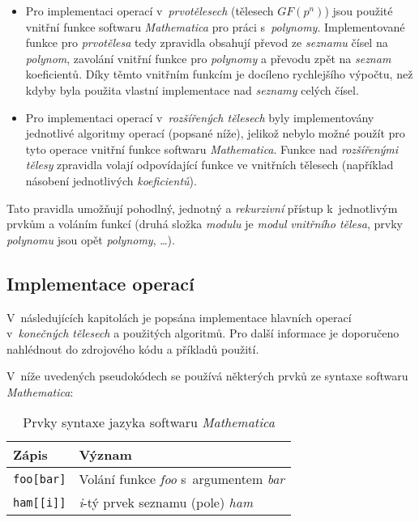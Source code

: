 \documentclass[thesis=M,czech,hidelinks]{FITthesis}[2012/06/26]
\newcommand{\0}{{\textcolor[gray]{0.100}{0}}}
\begin{document}
\begin{itemize}
    \item Pro implementaci operací v~\emph{prvotělesech} (tělesech $GF(p^n)$)
        jsou použité vnitřní funkce softwaru \emph{Mathematica} pro práci
        s~\emph{polynomy}. Implementované funkce pro \emph{prvotělesa} tedy
        zpravidla obsahují převod ze \emph{seznamu} čísel na \emph{polynom},
        zavolání vnitřní funkce pro \emph{polynomy} a převodu zpět na
        \emph{seznam} koeficientů. Díky těmto vnitřním funkcím je docíleno
        rychlejšího výpočtu, než kdyby byla použita vlastní implementace nad
        \emph{seznamy} celých čísel.

    \item Pro implementaci operací v~\emph{rozšířených tělesech} byly
        implementovány jednotlivé algoritmy operací (popsané níže), jelikož
        nebylo možné použít pro tyto operace vnitřní funkce softwaru
        \emph{Mathematica}. Funkce nad \emph{rozšířenými tělesy} zpravidla
        volají odpovídající funkce ve vnitřních tělesech (například násobení
        jednotlivých \emph{koeficientů}).

\end{itemize}

Tato pravidla umožňují pohodlný, jednotný a \emph{rekurzivní} přístup
k~jednotlivým prvkům a voláním funkcí (druhá složka \emph{modulu} je
\emph{modul} \emph{vnitřního tělesa}, prvky \emph{polynomu} jsou opět
\emph{polynomy}, \ldots).

\subsection{Implementace operací}
V~následujících kapitolách je popsána implementace hlavních operací
v~\emph{konečných tělesech} a použitých algoritmů. Pro další informace je
doporučeno nahlédnout do zdrojového kódu a příkladů použití.

V~níže uvedených pseudokódech se používá některých prvků ze syntaxe softwaru
\emph{Mathematica}:

\begin{table}[h!]
    \centering
    \begin{tabular}{l  l}
        Zápis               & Význam                                            \\
        \hline
        \texttt{foo[bar]}   & Volání funkce \emph{foo} s~argumentem \emph{bar}  \\
        \texttt{ham[[i]]}   & \emph{i}-tý prvek seznamu (pole) \emph{ham}       \\
    \end{tabular}
    \caption{Prvky syntaxe jazyka softwaru \emph{Mathematica}}
\end{table}
\end{document}

